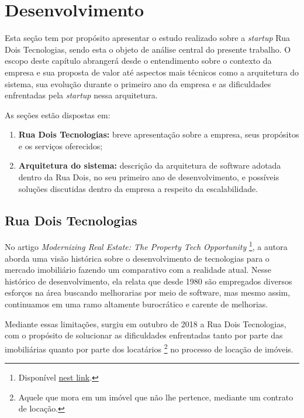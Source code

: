 \chapter{Desenvolvimento}

Esta seção tem por propósito apresentar o estudo realizado sobre a
\textit{startup} Rua Dois Tecnologias, sendo esta o objeto de análise
central do presente trabalho. O escopo deste capítulo abrangerá desde
o entendimento sobre o contexto da empresa e sua proposta de valor
até aspectos mais técnicos como a arquitetura do sistema, sua evolução
durante o primeiro ano da empresa e as dificuldades enfrentadas pela
\textit{startup} nessa arquitetura.

  As seções estão dispostas em:

  \begin{enumerate}
    \item \textbf{Rua Dois Tecnologias:} breve apresentação sobre a empresa,
      seus propósitos e os serviços oferecidos;
    \item \textbf{Arquitetura do sistema:} descrição da arquitetura de software
      adotada dentro da Rua Dois, no seu primeiro ano de desenvolvimento, e possíveis
      soluções discutidas dentro da empresa a respeito da escalabilidade.
  \end{enumerate}

\section{Rua Dois Tecnologias}

No artigo \textit{Modernizing Real Estate: The Property Tech Opportunity}
\footnote{Disponível
\href{https://www.forbes.com/sites/valleyvoices/2019/02/22/the-proptech-opportunity}{nest link}.},
a autora  aborda uma visão histórica sobre o desenvolvimento
de tecnologias para o mercado imobiliário fazendo um comparativo com a realidade atual.
Nesse histórico de desenvolvimento, ela relata que desde 1980 são empregados
diversos esforços na área buscando melhorarias por meio de software, mas mesmo
assim, continuamos em uma ramo altamente burocrático e carente de melhorias.

Mediante essas limitações, surgiu em outubro de 2018 a Rua Dois Tecnologias,
com o propósito de solucionar as dificuldades enfrentadas tanto por parte das
imobiliárias quanto por parte dos locatários \footnote{Aquele que mora em um imóvel
que não lhe pertence, mediante um contrato de locação.} no processo de locação de imóveis.

